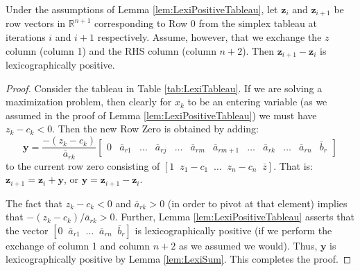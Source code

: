 \begin{lemma} Under the assumptions of Lemma \ref{lem:LexiPositiveTableau}, let $\mathbf{z}_i$ and $\mathbf{z}_{i+1}$ be row vectors in $\mathbb{R}^{n+1}$ corresponding to Row 0 from the simplex tableau at iterations $i$ and $i+1$ respectively. Assume, however, that we exchange the $z$ column (column 1) and the RHS column (column $n+2$).
Then $\mathbf{z}_{i+1} - \mathbf{z}_{i}$ is lexicographically positive. 
\label{lem:LexiRow0}
\end{lemma}
\begin{proof} Consider the tableau in Table \ref{tab:LexiTableau}. If we are solving a maximization problem, then clearly for $x_k$ to be an entering variable (as we assumed in the proof of Lemma \ref{lem:LexiPositiveTableau}) we must have $z_k - c_k < 0$. Then the new Row Zero is obtained by adding:
\begin{displaymath}
\mathbf{y} = \frac{-(z_k - c_k)}{\overline{a}_{rk}}\left[
\begin{array}{cccccccccccc}
0 & \overline{a}_{r1} & \dots & \overline{a}_{rj} & \dots & \overline{a}_{rm} & \overline{a}_{rm+1} & \dots & \overline{a}_{rk} & \dots & \overline{a}_{rn} & \overline{b}_r
\end{array}\right]
\end{displaymath}
to the current row zero consisting of $[1\;\;z_1 - c_1\;\;\dots\;\;z_n - c_n\;\;\overline{z}]$. That is: $\mathbf{z}_{i+1} = \mathbf{z}_i + \mathbf{y}$, or $\mathbf{y} = \mathbf{z}_{i+1} - \mathbf{z}_{i}$.

The fact that $z_k - c_k < 0$ and $\overline{a}_{rk} > 0$ (in order to pivot at that element) implies that $-(z_k - c_k)/\overline{a}_{rk} > 0$. Further, Lemma \ref{lem:LexiPositiveTableau} asserts that the vector $[0\;\;\overline{a}_{r1}\;\;\dots\;\;\overline{a}_{rn}\;\;\overline{b}_r]$ is lexicographically positive (if we perform the exchange of column 1 and column $n+2$ as we assumed we would). Thus, $\mathbf{y}$ is lexicographically positive by Lemma \ref{lem:LexiSum}. This completes the proof.
\end{proof}

